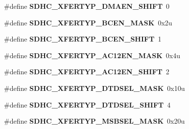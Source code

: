 \begin{DoxyCompactItemize}
\item 
\#define {\bfseries S\+D\+H\+C\+\_\+\+X\+F\+E\+R\+T\+Y\+P\+\_\+\+D\+M\+A\+E\+N\+\_\+\+S\+H\+I\+FT}~0\hypertarget{group__SDHC__Register__Masks_ga5cecfd8f158b456d3a2a9ea7820117b2}{}\label{group__SDHC__Register__Masks_ga5cecfd8f158b456d3a2a9ea7820117b2}

\item 
\#define {\bfseries S\+D\+H\+C\+\_\+\+X\+F\+E\+R\+T\+Y\+P\+\_\+\+B\+C\+E\+N\+\_\+\+M\+A\+SK}~0x2u\hypertarget{group__SDHC__Register__Masks_ga1d7dcef14285859fb5f204d71d2083cc}{}\label{group__SDHC__Register__Masks_ga1d7dcef14285859fb5f204d71d2083cc}

\item 
\#define {\bfseries S\+D\+H\+C\+\_\+\+X\+F\+E\+R\+T\+Y\+P\+\_\+\+B\+C\+E\+N\+\_\+\+S\+H\+I\+FT}~1\hypertarget{group__SDHC__Register__Masks_ga25223c582d559cd31d3de92191c681c7}{}\label{group__SDHC__Register__Masks_ga25223c582d559cd31d3de92191c681c7}

\item 
\#define {\bfseries S\+D\+H\+C\+\_\+\+X\+F\+E\+R\+T\+Y\+P\+\_\+\+A\+C12\+E\+N\+\_\+\+M\+A\+SK}~0x4u\hypertarget{group__SDHC__Register__Masks_ga1940add41a5918da9c0b045597e0c497}{}\label{group__SDHC__Register__Masks_ga1940add41a5918da9c0b045597e0c497}

\item 
\#define {\bfseries S\+D\+H\+C\+\_\+\+X\+F\+E\+R\+T\+Y\+P\+\_\+\+A\+C12\+E\+N\+\_\+\+S\+H\+I\+FT}~2\hypertarget{group__SDHC__Register__Masks_ga2e8fdd12bcab3fa4d4e6823eabaf65a0}{}\label{group__SDHC__Register__Masks_ga2e8fdd12bcab3fa4d4e6823eabaf65a0}

\item 
\#define {\bfseries S\+D\+H\+C\+\_\+\+X\+F\+E\+R\+T\+Y\+P\+\_\+\+D\+T\+D\+S\+E\+L\+\_\+\+M\+A\+SK}~0x10u\hypertarget{group__SDHC__Register__Masks_ga608ac3efa7417c8763511d336a8cb6c7}{}\label{group__SDHC__Register__Masks_ga608ac3efa7417c8763511d336a8cb6c7}

\item 
\#define {\bfseries S\+D\+H\+C\+\_\+\+X\+F\+E\+R\+T\+Y\+P\+\_\+\+D\+T\+D\+S\+E\+L\+\_\+\+S\+H\+I\+FT}~4\hypertarget{group__SDHC__Register__Masks_ga669da614be8810a42499b583e2ce2617}{}\label{group__SDHC__Register__Masks_ga669da614be8810a42499b583e2ce2617}

\item 
\#define {\bfseries S\+D\+H\+C\+\_\+\+X\+F\+E\+R\+T\+Y\+P\+\_\+\+M\+S\+B\+S\+E\+L\+\_\+\+M\+A\+SK}~0x20u\hypertarget{group__SDHC__Register__Masks_gafb2312829ed2798040e4b2b0f17a0114}{}\label{group__SDHC__Register__Masks_gafb2312829ed2798040e4b2b0f17a0114}


\end{DoxyCompactItemize}
